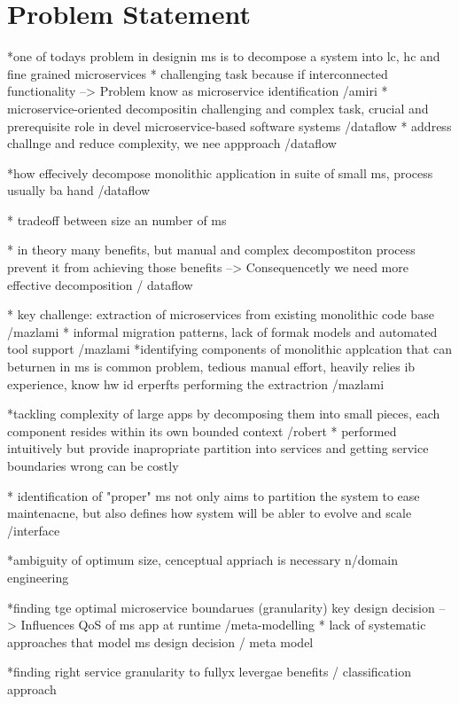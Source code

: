 \section{Problem Statement}
\label{sec:Introduction:ProblemStatement}

*one of todays problem in designin ms is to decompose a system into lc, hc and fine grained microservices \cite{ObjectAwareAmiri}
* challenging task because if interconnected functionality --> Problem know as microservice identification /amiri
* microservice-oriented decompositin challenging and complex task, crucial and prerequisite role in devel microservice-based software systems /dataflow
* address challnge and reduce complexity, we nee appproach /dataflow

*how effecively decompose monolithic application in suite of small ms, process usually ba hand /dataflow

* tradeoff between size an number of ms \cite{interfaceAnalysisBaresi}

* in theory many benefits, but manual and complex decompostiton process prevent it from achieving those benefits --> Consequencetly we need more effective decomposition / dataflow

* key challenge: extraction of microservices from existing monolithic code base /mazlami
* informal migration patterns, lack of formak models and automated tool support /mazlami
*identifying components of monolithic applcation that can beturnen in ms is common problem, tedious manual effort, heavily relies ib experience, know hw id erperfts performing the extractrion /mazlami

*tackling complexity of large apps by decomposing them into small pieces, each component resides within its own bounded context /robert
* performed intuitively but provide inapropriate partition into services and getting service boundaries wrong can be costly

* identification of "proper" ms not only aims to partition the system to ease maintenacne, but also defines how system will be abler to evolve and scale /interface

*ambiguity of optimum size, cenceptual appriach is necessary n/domain engineering

*finding tge optimal microservice boundarues (granularity) key design decision --> Influences QoS of ms app at runtime /meta-modelling
* lack of systematic approaches that model ms design decision / meta model

*finding right service granularity to fullyx levergae benefits / classification approach

